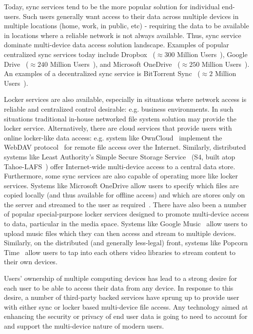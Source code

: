 Today, sync services tend to be the more popular solution for
individual end-users. Such users generally want access to their data
across multiple devices in multiple locations (home, work, in public,
etc) - requiring the data to be available in locations where a
reliable network is not always available. Thus, sync service dominate
multi-device data access solution landscape. Examples of popular
centralized sync services today include Dropbox~\cite{dropbox}
($\approx300$ Million Users~\cite{smith-stats}), Google
Drive~\cite{google-drive} ($\approx240$ Million
Users~\cite{smith-stats}), and Microsoft
OneDrive~\cite{microsoft-onedrive} ($\approx250$ Million
Users~\cite{smith-stats}).  An examples of a decentralized sync
service is BitTorrent Sync~\cite{bittorrent-sync} ($\approx2$ Million
Users~\cite{smith-stats}).

Locker services are also available, especially in situations where
network access is reliable and centralized control desirable:
e.g. business environments. In such situations traditional in-house
networked file system solution may provide the locker
service. Alternatively, there are cloud services that provide users
with online locker-like data access: e.g. system like
OwnCloud~\cite{owncloud} implement the WebDAV
protocol~\cite{Goland1999} for remote file access over the
Internet. Similarly, distributed systems like Least Authority's Simple
Secure Storage Service~\cite{leastauthority-s4} (S4, built atop
Tahoe-LAFS~\cite{Wilcox-O'Hearn2008}) offer Internet-wide multi-device
access to a central data store. Furthermore, some sync services are
also capable of operating more like locker services. Systems like
Microsoft OneDrive allow users to specify which files are copied
locally (and thus available for offline access) and which are stores
only on the server and streamed to the user as
required~\cite{microsoft-onedrive-online}. There have also been a
number of popular special-purpose locker services designed to promote
multi-device access to data, particular in the media space. Systems
like Google Music~\cite{google-music} allow users to upload music
files which they can then access and stream to multiple
devices. Similarly, on the distributed (and generally less-legal)
front, systems like Popcorn Time~\cite{popcorntime} allow users to tap
into each others video libraries to stream content to their own
devices.

Users' ownership of multiple computing devices has lead to a strong
desire for each user to be able to access their data from any
device. In response to this desire, a number of third-party backed
services have sprung up to provide user with either sync or locker
based multi-device file access. Any technology aimed at enhancing the
security or privacy of end user data is going to need to account for
and support the multi-device nature of modern users.

